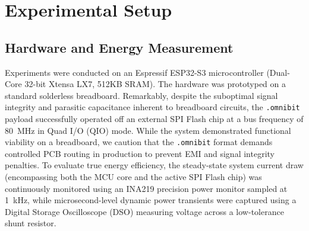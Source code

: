 \documentclass[conference]{IEEEtran}
\begin{document}
\section{Experimental Setup}

\subsection{Hardware and Energy Measurement}
Experiments were conducted on an Espressif ESP32-S3 microcontroller (Dual-Core 32-bit Xtensa LX7, 512KB SRAM). The hardware was prototyped on a standard solderless breadboard. Remarkably, despite the suboptimal signal integrity and parasitic capacitance inherent to breadboard circuits, the \texttt{.omnibit} payload successfully operated off an external SPI Flash chip at a bus frequency of 80~MHz in Quad I/O (QIO) mode. While the system demonstrated functional viability on a breadboard, we caution that the \texttt{.omnibit} format demands controlled PCB routing in production to prevent EMI and signal integrity penalties. To evaluate true energy efficiency, the steady-state system current draw (encompassing both the MCU core and the active SPI Flash chip) was continuously monitored using an INA219 precision power monitor sampled at 1~kHz, while microsecond-level dynamic power transients were captured using a Digital Storage Oscilloscope (DSO) measuring voltage across a low-tolerance shunt resistor.
\end{document}
